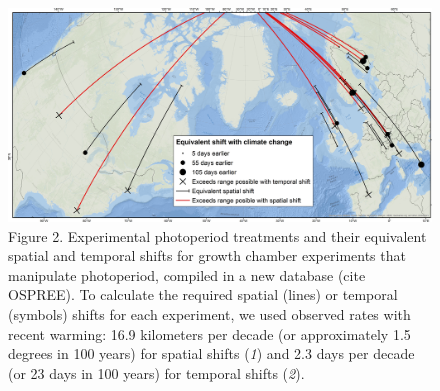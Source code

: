 \documentclass[10.5pt,a4paper]{letter}
\begin{document}
\begin{letter}{}
\begin{footnotesize}
 \begin{figure}
\centering
\includegraphics[width=180mm,scale=0.5]{..//..//analyses/photoperiod/figures/ospree_photopmap_fromblake.jpg} 
\caption{Figure 2. Experimental photoperiod treatments and their equivalent spatial and temporal shifts for growth chamber experiments that manipulate photoperiod, compiled in a new database (cite OSPREE). To calculate the required spatial (lines) or temporal (symbols) shifts for each experiment, we used observed rates with recent warming: 16.9 kilometers per decade (or approximately 1.5 degrees in 100 years) for spatial shifts (\emph{1}) and 2.3 days per decade (or 23 days in 100 years) for temporal shifts (\emph{2}).}
 \label{fig:photomap}
 \end{figure}


\end{footnotesize}
\end{letter}
\end{document}
